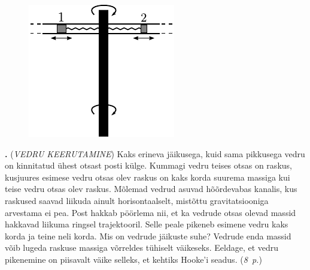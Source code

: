 \documentclass[11pt,a5paper]{article}
\newcommand{\numb}[1]{\vspace{5pt}\textbf{\large #1}}
\newcommand{\nimi}[1]{(\textsl{\small #1})}
\newcommand{\punktid}[1]{(\emph{#1~p.})}
\newcounter{ylesanne}
\newcommand{\yl}[1]{\addtocounter{ylesanne}{1}\numb{\theylesanne.} \nimi{#1} \newblock{}}
\newcommand{\autor}[1]{}%
\begin{document}
\begin{figure}
  \vspace{-2em}
  \begin{center}
    \includegraphics[width=1\linewidth]{vedru_keerutamine_joonis.pdf}
  \end{center}
  \vspace{-2em}
\end{figure}

\yl{VEDRU KEERUTAMINE}
Kaks erineva jäikusega, kuid sama pikkusega vedru on kinnitatud ühest otsast posti külge. Kummagi vedru teises otsas on raskus, kusjuures esimese vedru otsas olev raskus on kaks korda suurema massiga kui teise vedru otsas olev raskus. Mõlemad vedrud asuvad hõõrdevabas kanalis, kus raskused saavad liikuda ainult horisontaalselt, mistõttu gravitatsiooniga arvestama ei pea. Post hakkab pöörlema nii, et ka vedrude otsas olevad massid hakkavad liikuma ringsel trajektooril. Selle peale pikeneb esimene vedru kaks korda ja teine neli korda. Mis on vedrude jäikuste suhe? Vedrude enda massid võib lugeda raskuse massiga võrreldes tühiselt väikeseks. Eeldage, et vedru pikenemine on piisavalt väike selleks, et kehtiks Hooke'i seadus.
\punktid{8} \autor{Sandra Schumann}
\end{document}
